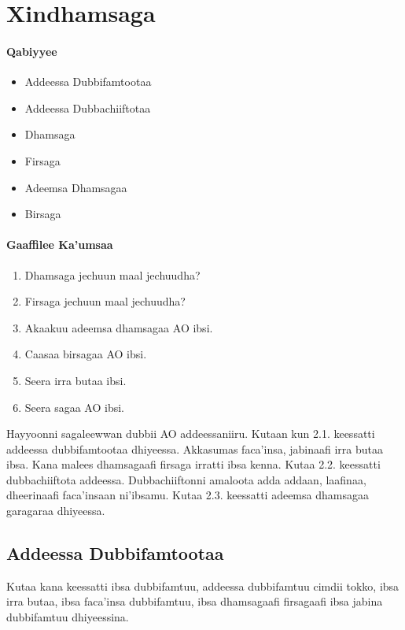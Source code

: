 \documentclass[11pt,b5paper]{book}
\begin{document}
\chapter{Xindhamsaga}
\setlength{\parindent}{3em}
\subsubsection{Qabiyyee}

\begin{itemize}
  \item Addeessa Dubbifamtootaa
  \item Addeessa Dubbachiiftotaa
  \item Dhamsaga
  \item Firsaga
  \item Adeemsa Dhamsagaa
  \item Birsaga
\end{itemize}
\subsubsection{Gaaffilee Ka'umsaa}
\begin{enumerate}
	\item Dhamsaga jechuun maal jechuudha?
	\item Firsaga jechuun maal jechuudha?
	\item Akaakuu adeemsa dhamsagaa AO ibsi.
	\item Caasaa birsagaa AO ibsi.
	\item Seera irra butaa ibsi.
	\item Seera sagaa AO ibsi.
\end{enumerate}

Hayyoonni sagaleewwan dubbii AO addeessaniiru\cite{griefenow2001grammatical,owens1985grammar,wako1981}. Kutaan kun 2.1.  keessatti addeessa dubbifamtootaa dhiyeessa. Akkasumas  faca’insa, jabinaafi irra butaa ibsa. Kana malees dhamsagaafi  firsaga irratti ibsa kenna. Kutaa 2.2. keessatti dubbachiiftota  addeessa. Dubbachiiftonni amaloota adda addaan, laafinaa,
dheerinaafi faca’insaan ni’ibsamu. Kutaa 2.3. keessatti  adeemsa dhamsagaa garagaraa dhiyeessa.
  
\section{Addeessa Dubbifamtootaa}

Kutaa kana keessatti ibsa dubbifamtuu, addeessa dubbifamtuu  cimdii tokko, ibsa irra butaa, ibsa faca’insa dubbifamtuu, ibsa  dhamsagaafi firsagaafi ibsa jabina dubbifamtuu dhiyeessina.
\end{document}
